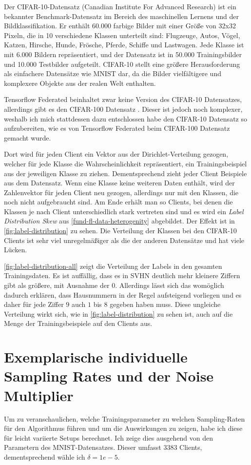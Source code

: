 Der CIFAR-10-Datensatz (Canadian Institute For Advanced Research) ist ein bekannter Benchmark-Datensatz im Bereich des maschinellen Lernens und der Bildklassifikation. Er enthält 60.000 farbige Bilder mit einer Größe von 32x32 Pixeln, die in 10 verschiedene Klassen unterteilt sind: Flugzeuge, Autos, Vögel, Katzen, Hirsche, Hunde, Frösche, Pferde, Schiffe und Lastwagen. Jede Klasse ist mit 6.000 Bildern repräsentiert, und der Datensatz ist in 50.000 Trainingsbilder und 10.000 Testbilder aufgeteilt. CIFAR-10 stellt eine größere Herausforderung als einfachere Datensätze wie MNIST dar, da die Bilder vielfältigere und komplexere Objekte aus der realen Welt enthalten. 

Tensorflow Federated beinhaltet zwar keine Version des CIFAR-10 Datensatzes, allerdings gibt es den CIFAR-100 Datensatz \cite{krizhevsky:2009}. Dieser ist jedoch noch komplexer, weshalb ich mich stattdessen dazu entschlossen habe den CIFAR-10 Datensatz so aufzubereiten, wie es von Tensorflow Federated beim CIFAR-100 Datensatz gemacht wurde. 

Dort wird für jeden Client ein Vektor aus der Dirichlet-Verteilung gezogen, welcher für jede Klasse die Wahrscheinlichkeit repräsentiert, ein Trainingsbeispiel aus der jeweiligen Klasse zu ziehen. Dementsprechend zieht jeder Client Beispiele aus dem Datensatz. Wenn eine Klasse keine weiteren Daten enthält, wird der Zahlenvektor für jeden Client neu gezogen, allerdings nur mit den Klassen, die noch nicht aufgebraucht sind. Am Ende erhält man so Clients, bei denen die Klassen je nach Client unterschiedlich stark vertreten sind und es wird ein \textit{Label Distribution Skew} aus \autoref{fund-fl-data-heterogenity} abgebildet. Der Effekt ist in \autoref{fig:label-distribution} zu sehen. Die Verteilung der Klassen bei den CIFAR-10 Clients ist sehr viel unregelmäßiger als die der anderen Datensätze und hat viele Lücken.

\autoref{fig:label-distribution-all} zeigt die Verteilung der Labels in den gesamten Trainingsdaten. Es ist auffällig, dass es in SVHN deutlich mehr kleinere Ziffern gibt als größere, mit Ausnahme der $0$. Allerdings lässt sich das womöglich dadurch erklären, dass Hausnummern in der Regel aufsteigend vorliegen und es daher für jede Ziffer $9$ auch $1$ bis $8$ gegeben haben muss. Diese ungleiche Verteilung wirkt sich, wie in \autoref{fig:label-distribution} zu sehen ist, auch auf die Menge der Trainingsbeispiele auf den Clients aus.

\section{Exemplarische individuelle Sampling Rates und der Noise Multiplier}
Um zu veranschaulichen, welche Trainingsparameter zu welchen Sampling-Raten für den Algorithmus führen und um die Auswirkungen zu zeigen, habe ich diese für leicht variierte Setups berechnet. Ich zeige dies ausgehend von den Parametern des MNIST-Datensatzes. Dieser umfasst $3383$ Clients, dementsprechend wähle ich $\delta= 1e-5$. 

